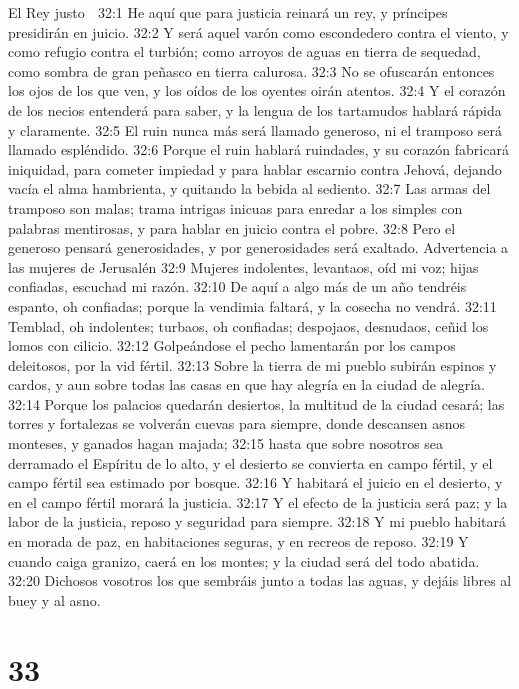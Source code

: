 El Rey justo  

32:1 He aquí que para justicia reinará un rey, y príncipes presidirán en juicio.  
32:2 Y será aquel varón como escondedero contra el viento, y como refugio contra el turbión; como arroyos de aguas en tierra de sequedad, como sombra de gran peñasco en tierra calurosa.  
32:3 No se ofuscarán entonces los ojos de los que ven, y los oídos de los oyentes oirán atentos.  
32:4 Y el corazón de los necios entenderá para saber, y la lengua de los tartamudos hablará rápida y claramente.  
32:5 El ruin nunca más será llamado generoso, ni el tramposo será llamado espléndido.  
32:6 Porque el ruin hablará ruindades, y su corazón fabricará iniquidad, para cometer impiedad y para hablar escarnio contra Jehová, dejando vacía el alma hambrienta, y quitando la bebida al sediento.  
32:7 Las armas del tramposo son malas; trama intrigas inicuas para enredar a los simples con palabras mentirosas, y para hablar en juicio contra el pobre.  
32:8 Pero el generoso pensará generosidades, y por generosidades será exaltado.  
Advertencia a las mujeres de Jerusalén  
32:9 Mujeres indolentes, levantaos, oíd mi voz; hijas confiadas, escuchad mi razón.  
32:10 De aquí a algo más de un año tendréis espanto, oh confiadas; porque la vendimia faltará, y la cosecha no vendrá.  
32:11 Temblad, oh indolentes; turbaos, oh confiadas; despojaos, desnudaos, ceñid los lomos con cilicio.  
32:12 Golpeándose el pecho lamentarán por los campos deleitosos, por la vid fértil.  
32:13 Sobre la tierra de mi pueblo subirán espinos y cardos, y aun sobre todas las casas en que hay alegría en la ciudad de alegría.  
32:14 Porque los palacios quedarán desiertos, la multitud de la ciudad cesará; las torres y fortalezas se volverán cuevas para siempre, donde descansen asnos monteses, y ganados hagan majada;  
32:15 hasta que sobre nosotros sea derramado el Espíritu de lo alto, y el desierto se convierta en campo fértil, y el campo fértil sea estimado por bosque.  
32:16 Y habitará el juicio en el desierto, y en el campo fértil morará la justicia.  
32:17 Y el efecto de la justicia será paz; y la labor de la justicia, reposo y seguridad para siempre.  
32:18 Y mi pueblo habitará en morada de paz, en habitaciones seguras, y en recreos de reposo.  
32:19 Y cuando caiga granizo, caerá en los montes; y la ciudad será del todo abatida.  
32:20 Dichosos vosotros los que sembráis junto a todas las aguas, y dejáis libres al buey y al asno.  

\chapter{33}

